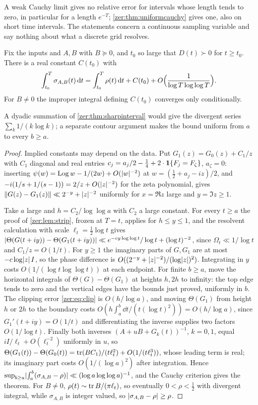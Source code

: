 A weak Cauchy limit gives no relative error for intervals whose length tends to zero, in particular
for a length $e^{-T}$; \cref{zer:thm:uniformcauchy} gives one, also on short time intervals. The
statements concern a continuous sampling variable and say nothing about what a discrete grid resolves.

\begin{theorem}\label{zer:thm:finitepart}
Fix the inputs and $A,B$ with $B\succeq0$, and $t_0$ so large that $D(t)\succ0$ for $t\ge t_0$. There is a real
constant $C(t_0)$ with
\[
 \int_{t_0}^T\sigma_{A,B}(t)\,\mathrm{d} t=\int_{t_0}^T\rho(t)\,\mathrm{d} t+C(t_0)+O\Bigl(\frac1{\log T\log\log T}\Bigr).
\]
For $B\ne0$ the improper integral defining $C(t_0)$ converges only conditionally.
\end{theorem}

A dyadic summation of \cref{zer:thm:sharpinterval} would give the divergent series $\sum_k1/(k\log k)$; a separate
contour argument makes the bound uniform from $a$ to every $b\ge a$.

\begin{proof}
Implied constants may depend on the data. Put $G_1(z)=G_0(z)+C_1/z$ with $C_1$ diagonal and real entries
$c_j=a_j/2-\tfrac14+2\cdot\mathbf 1\{F_j=F_\zeta\}$, $a_\zeta=0$: inserting $\psi(w)=\operatorname{Log} w-1/(2w)+O(\lvert w\rvert^{-2})$ at
$w=(\tfrac12+a_j-iz)/2$, and $-i(1/s+1/(s-1))=2/z+O(\lvert z\rvert^{-2})$ for the zeta polynomial, gives
$\lVert G(z)-G_1(z)\rVert\ll2^{-y}+\lvert z\rvert^{-2}$ uniformly for $x=\Re z$ large and $y=\Im z\ge1$.

Take $a$ large and $h=C_2/\log\log a$ with $C_2$ a large constant. For every $t\ge a$ the proof of
\cref{zer:lem:strip}, frozen at $T=t$, applies for $h\le y\le1$, and the resolvent calculation with scale
$\ell_t=\tfrac12\log t$ gives
$\lvert\Theta(G(t+iy))-\Theta(G_1(t+iy))\rvert\ll e^{-cy\log\log t}/\log t+(\log t)^{-2}$, since $\Omega_t\ll1/\log t$ and $C_1/z=O(1/t)$.
For $y\ge1$ the imaginary parts of $G,G_1$ are at most $-c\log\lvert z\rvert\,I$, so the phase difference is
$O((2^{-y}+\lvert z\rvert^{-2})/(\log\lvert z\rvert)^2)$. Integrating in $y$ costs $O(1/(\log t\log\log t))$ at each endpoint.
For finite $b\ge a$, move the horizontal integrals of $\Theta(G)-\Theta(G_1)$ at heights $h,2h$ to infinity:
the top edge tends to zero and the vertical edges have the bounds just proved, uniformly in $b$. The
clipping error \eqref{zer:eq:clip} is $O(h/\log a)$, and moving $\Theta(G_1)$ from height $h$ or $2h$ to the
boundary costs $O(h\int_a^b\dd t/(t(\log t)^2))=O(h/\log a)$, since $G_1'(t+iy)=O(1/t)$ and differentiating the
inverse supplies two factors $O(1/\log t)$. Finally both inverses $(A+uB+G_k(t))^{-1}$, $k=0,1$, equal
$iI/\ell_t+O(\ell_t^{-2})$ uniformly in $u$, so
$\Theta(G_1(t))-\Theta(G_0(t))=\operatorname{tr}(BC_1)/(t\ell_t^2)+O(1/(t\ell_t^3))$, whose leading term is real; its imaginary part
costs $O(1/(\log a)^2)$ after integration. Hence $\sup_{b\ge a}\lvert\int_a^b(\sigma_{A,B}-\rho)\rvert\ll(\log a\log\log a)^{-1}$,
and the Cauchy criterion gives the theorem. For $B\ne0$, $\rho(t)\sim\operatorname{tr} B/(\pi\ell_t)$, so eventually
$0<\rho<\tfrac12$ with divergent integral, while $\sigma_{A,B}$ is integer valued, so $\lvert\sigma_{A,B}-\rho\rvert\ge\rho$.
\end{proof}


